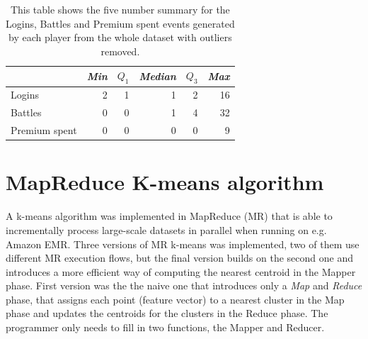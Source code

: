\begin{table}[h]
\centering
\begin{tabular}{| l | r | r | r | r | r |}
    \hline
    & \textit{Min} & $Q_1$ & \textit{Median} & $Q_3$ & \textit{Max} \\ \hline
    Logins & 2 & 1 & 1 & 2 & 16 \\ \hline
    Battles & 0 & 0 & 1 & 4 & 32 \\ \hline
    Premium spent & 0 & 0 & 0 & 0 & 9 \\ \hline
\end{tabular}
\caption{This table shows the five number summary for the Logins, Battles and Premium spent events generated by each player from the whole dataset with outliers removed.}
\label{tab:FiveSummaryLoginsBattlesPremiumWoOutliers}
\end{table}


\begin{table}[h]
\centering
{}
\caption{This table shows the player population, number of outliers found and the percentage of the population removed, for each data batch.}
\label{tab:DatabatchesWoOutliers}
\end{table}


\newpage
\section{MapReduce K-means algorithm}
A k-means algorithm was implemented in MapReduce (MR) that is able to incrementally process large-scale datasets in parallel when running on e.g. Amazon EMR. Three versions of MR k-means was implemented, two of them use different MR execution flows, but the final version builds on the second one and introduces a more efficient way of computing the nearest centroid in the Mapper phase. First version was the the naive one that introduces only a \textit{Map} and \textit{Reduce} phase, that assigns each point (feature vector) to a nearest cluster in the Map phase and updates the centroids for the clusters in the Reduce phase. The programmer only needs to fill in two functions, the Mapper and Reducer. 

